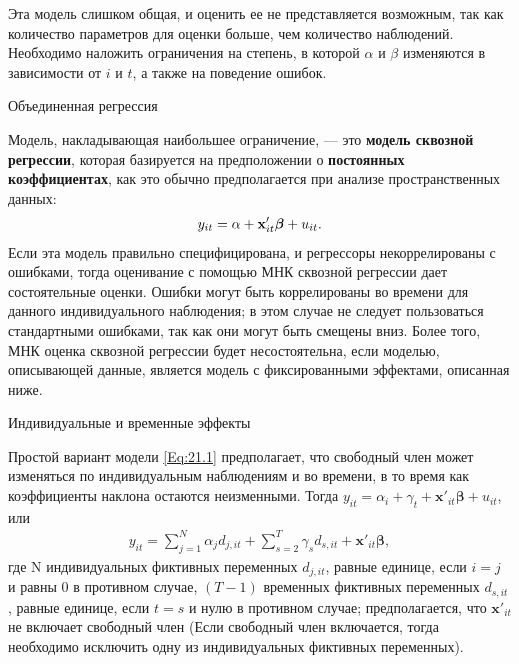 Эта модель слишком общая, и оценить ее не представляется возможным, так как количество параметров для оценки больше, чем количество наблюдений. Необходимо наложить ограничения на степень, в которой $\alpha$ и $\beta$ изменяются в зависимости от $i$ и $t$, а также на поведение ошибок.

\vspace{0.8cm}

{\centering
Объединенная регрессия\\}


Модель, накладывающая наибольшее ограничение, --- это \textbf{модель сквозной регрессии}, которая базируется на предположении о \textbf{постоянных коэффициентах}, как это обычно предполагается при анализе пространственных данных:
\begin{align}
y_{it}= \alpha + \mathbf{x}'_{it} \bm\beta + u_{it}.
\label{Eq:21.1}
\end{align}
Если эта модель правильно специфицирована, и регрессоры некоррелированы с ошибками, тогда оценивание с помощью МНК сквозной регрессии дает состоятельные оценки. Ошибки могут быть коррелированы во времени для данного индивидуального наблюдения; в этом случае не следует пользоваться стандартными ошибками, так как они могут быть смещены вниз. Более того, МНК оценка сквозной регрессии будет несостоятельна, если моделью, описывающей данные, является модель с фиксированными эффектами, описанная ниже.

{\centering
Индивидуальные и временные эффекты\\}

Простой вариант модели \ref{Eq:21.1} предполагает, что свободный член может изменяться по индивидуальным наблюдениям и во времени, в то время как коэффициенты наклона остаются неизменными. Тогда $y_{it}= \alpha_{i} + \gamma_t + \mathbf x'_{it} \bm\beta+ u_{it}$, или
\begin{align}
y_{it}=\sum \limits_{j=1}^{N} \alpha_j d_{j,it} + \sum \limits_{s=2}^{T} \gamma_s d_{s,it} +  \mathbf x'_{it} \bm\beta,
\label{Eq:21.2}
\end{align}
где N индивидуальных фиктивных переменных $d_{j,it}$, равные единице, если $i=j$ и равны 0 в противном случае, $(T-1)$ временных фиктивных переменных $d_{s,it}$, равные единице, если $t=s$ и нулю в противном случае; предполагается, что $\mathbf x'_{it}$ не включает свободный член (Если свободный член включается, тогда необходимо исключить одну из индивидуальных фиктивных переменных).

